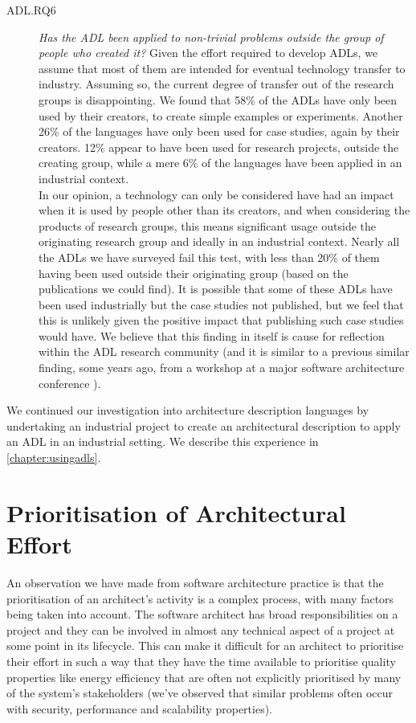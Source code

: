 \begin{description}
\item[ADL.RQ6] \emph{Has the ADL been applied to non-trivial problems outside the group of people who created it?}
Given the effort required to develop ADLs, we assume that most of them are intended for eventual technology transfer to industry.  Assuming so, the current degree of transfer out of the research groups is disappointing.  We found that 58\% of the ADLs have only been used by their creators, to create simple examples or experiments.  Another 26\% of the languages have only been used for case studies, again by their creators.  12\% appear to have been used for research projects, outside the creating group, while a mere 6\% of the languages have been applied in an industrial context. \\
In our opinion, a technology can only be considered have had an impact when it is used by people other than its creators, and when considering the products of research groups, this means significant usage outside the originating research group and ideally in an industrial context.  Nearly all the ADLs we have surveyed fail this test, with less than 20\% of them having been used outside their originating group (based on the publications we could find).  It is possible that some of these ADLs have been used industrially but the case studies not published, but we feel that this is unlikely given the positive impact that publishing such case studies would have.  We believe that this finding in itself is cause for reflection within the ADL research community (and it is similar to a previous similar finding, some years ago, from a workshop at a major software architecture conference \cite{woodshilliard2005-adlsinpractice}).
\end{description}

We continued our investigation into architecture description languages by undertaking an industrial project to create an architectural description to apply an ADL in an industrial setting.  We describe this experience in \cref{chapter:usingadls}.

\section{Prioritisation of Architectural Effort}
\label{section:litreview-prioritisation}

An observation we have made from software architecture practice is that the prioritisation of an architect's activity is a complex process, with many factors being taken into account. The software architect has broad responsibilities on a project and they can be involved in almost any technical aspect of a project at some point in its lifecycle. This can make it difficult for an architect to prioritise their effort in such a way that they have the time available to prioritise quality properties like energy efficiency that are often not explicitly prioritised by many of the system's stakeholders (we've observed that similar problems often occur with security, performance and scalability properties).

